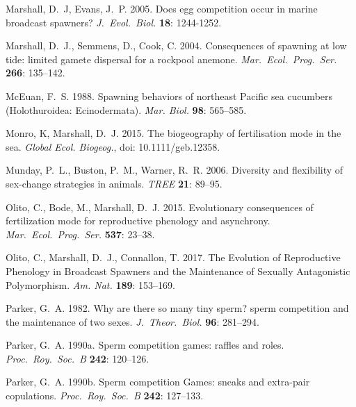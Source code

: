 \documentclass{article}
\begin{document}
\begin{thebibliography}{}
Marshall, D.~J, Evans, J.~P. 2005.
\newblock Does egg competition occur in marine broadcast spawners? 
\newblock \textit{J.~Evol.~Biol.} \textbf{18}: 1244-1252.

Marshall, D.~J., Semmens, D., Cook, C. 2004.
\newblock Consequences of spawning at low tide: limited gamete dispersal for a rockpool anemone.
\newblock \textit{Mar.~Ecol.~Prog.~Ser.} \textbf{266}: 135--142.

McEuan, F.~S. 1988.
\newblock Spawning behaviors of northeast Pacific sea cucumbers (Holothuroidea: Ecinodermata).
\newblock \textit{Mar. Biol.} \textbf{98}: 565--585.

Monro, K, Marshall, D.~J. 2015.
\newblock The biogeography of fertilisation mode in the sea.
\newblock \textit{Global Ecol. Biogeog.}, doi: 10.1111/geb.12358.

Munday, P.~L., Buston, P.~M., Warner, R.~R. 2006.
\newblock Diversity and flexibility of sex-change strategies in animals.
\newblock \textit{TREE} \textbf{21}: 89--95.

Olito, C., Bode, M., Marshall, D.~J. 2015.
\newblock Evolutionary consequences of fertilization mode for reproductive phenology and asynchrony.
\newblock \textit{Mar.~Ecol.~Prog.~Ser.} \textbf{537}: 23--38.

Olito, C., Marshall, D.~J., Connallon, T. 2017.
\newblock The Evolution of Reproductive Phenology in Broadcast Spawners and the Maintenance of Sexually Antagonistic Polymorphism.
\newblock \textit{Am. Nat.} \textbf{189}: 153--169.

Parker, G.~A. 1982.
\newblock Why are there so many tiny sperm? sperm competition and the maintenance of two sexes.
\newblock \textit{J.~Theor.~Biol.} \textbf{96}: 281--294.

Parker, G.~A. 1990a.
\newblock Sperm competition games: raffles and roles.
\newblock \textit{Proc.~Roy.~Soc.~B} \textbf{242}: 120--126.

Parker, G.~A. 1990b.
\newblock Sperm competition Games: sneaks and extra-pair copulations.
\newblock \textit{Proc.~Roy.~Soc.~B} \textbf{242}: 127--133.


\end{thebibliography}
\end{document}
